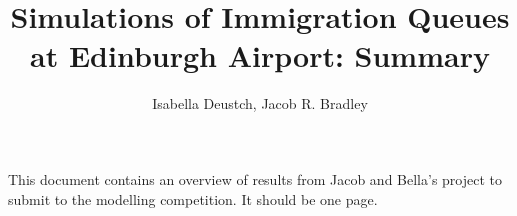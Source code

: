 \documentclass[12pt]{article}
\title{Simulations of Immigration Queues at Edinburgh Airport: Summary}
\author{Isabella Deustch, Jacob R. Bradley
 }
\date{}
\begin{document}
\maketitle

This document contains an overview of results from Jacob and Bella's project to submit to the modelling competition. It should be one page.

% 
\end{document}
